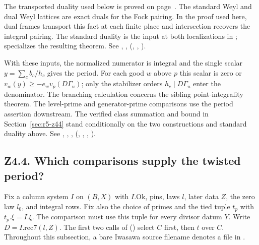 The transported duality used below is proved on page~\pageref{r13:weyl-dual}.
The standard Weyl and dual Weyl lattices are exact duals for the Fock pairing. In the proof used here, dual frames transport this fact at each finite place and intersection recovers the integral pairing. The standard duality is the input at both localizations in ;  specializes the resulting theorem. See , ,  (, , ).

With these inputs, the normalized numerator is integral and the single scalar $y=\sum_c b_c/h_c$ gives the period. For each good $w$ above $p$ this scalar is zero or $v_w(y)\ge-e_w v_p(D\Gamma_u)$; only the stabilizer orders $h_c\mid D\Gamma_u$ enter the denominator. The branching calculation concerns the sibling point-integrality theorem. The level-prime and generator-prime comparisons use the period assertion downstream. The verified class summation and bound in Section~\ref{sec:r5-z44} stand conditionally on the two constructions and standard duality above.
See , , ,  (, , , ).

\subsection{Z4.4. Which comparisons supply the twisted period?}\label{r11:z44}

Fix a column system $I$ on $(B,X)$ with $I.\mathrm{Ok}$, pins, laws $l$,
later data $Z$, the zero law $l_0$, and integral rows. Fix also the choice
of primes and the tied tuple $t_p$ with $t_p.\xi=I.\xi$. The comparison
must use this tuple for every divisor datum $Y$. Write $D=I.\mathrm{rec7}(l,Z)$.
The first two calls of 
()
select $C$ first, then $t$ over $C$. Throughout this subsection, a bare
Iwasawa source filename denotes a file in
.

